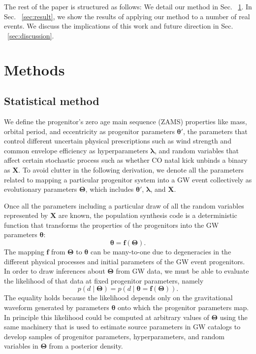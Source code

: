 \documentclass[linenumbers,twocolumn]{aastex631}
\begin{document}
The rest of the paper is structured as follows: We detail our method in Sec.
~\ref{sec:method}. In Sec. ~\ref{sec:result}, we show the results of applying
our method to a number of real events. We discuss the implications of this work
and future direction in Sec. ~\ref{sec:discussion}.

\section{Methods}
\label{sec:method}

\subsection{\textbf{Statistical method}}
\label{subsec:stats}
We define the progenitor's zero age main sequence (ZAMS) properties like mass,
orbital period, and eccentricity as progenitor parameters $\bm{\theta'}$, the
parameters that control different uncertain physical prescriptions such as wind
strength and common envelope efficiency as hyperparameters $\bm{\lambda}$, and
random variables that affect certain stochastic process such as whether CO natal
kick unbinds a binary as $\bm{X}$. To avoid clutter in the following derivation,
we denote all the parameters related to mapping a particular progenitor system
into a GW event collectively as evolutionary parameters $\bm{\Theta}$, which
includes $\bm{\theta'}$, $\bm{\lambda}$, and $\bm{X}$.

Once all the parameters including a particular draw of all the random variables
represented by $\bm{X}$ are known, the population synthesis code is a
deterministic function that transforms the properties of the progenitors into
the GW parameters $\bm{\theta}$:
\begin{equation}
    \bm{\theta} = \bm{f}\left( \bm{\Theta} \right).
\end{equation}
The mapping $\bm{f}$ from $\bm{\Theta}$ to $\bm{\theta}$ can be many-to-one due
to degeneracies in the different physical processes and initial parameters of
the GW event progenitors. In order to draw inferences about $\bm{\Theta}$ from
GW data, we must be able to evaluate the likelihood of that data at fixed
progenitor parameters, namely
\begin{equation}
    p\left( d \mid \bm{\Theta} \right) = p\left( d \mid \bm{\theta} = \bm{f}\left( \bm{\Theta} \right) \right).
\end{equation}
The equality holds because the likelihood depends only on the gravitational
waveform generated by parameters $\bm{\theta}$ onto which the progenitor
parameters map.  In principle this likelihood could be computed at arbitrary
values of $\bm{\Theta}$ using the same machinery that is used to estimate source
parameters in GW catalogs \citep{Veitch2015,Ashton2019,Romero-Shaw2020,GWTC-3}
to develop samples of progenitor parameters, hyperparameters, and random
variables in $\bm{\Theta}$ from a posterior density.
\end{document}
